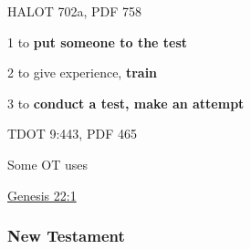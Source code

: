 				\begin{compactdesc}
					\item[HALOT 702a, PDF 758] \textbf{} %
						\begin{compactitem}
							\item[1] to \textbf{put someone to the test}
							\item[2] to give experience, \textbf{train}
							\item[3] to \textbf{conduct a test, make an attempt}
						\end{compactitem}
					\item[TDOT 9:443, PDF 465]
				\end{compactdesc}
				
				\begin{compactdesc}
					\item[Some OT uses] \textbf{}
						\begin{compactdesc}
							\item[{\hyperref[GENESIS-22-1]{Genesis 22:1}}]
						\end{compactdesc}
				\end{compactdesc}
			
		
		
	\subsubsection{New Testament} %
		\label{TEMPTATION-NT}
	
	
